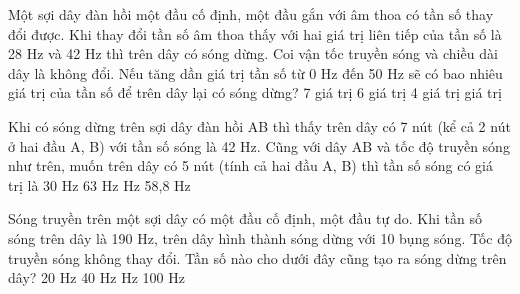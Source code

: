 \begin{ex}%
Một sợi dây đàn hồi một đầu cố định, một đầu gắn với âm thoa có tần số thay đổi được. Khi thay đổi tần số âm thoa thấy với hai giá trị liên tiếp của tần số là 28 Hz và 42 Hz thì trên dây có sóng dừng. Coi vận tốc truyền sóng và chiều dài dây là không đổi. Nếu tăng dần giá trị tần số từ 0 Hz đến 50 Hz sẽ có bao nhiêu giá trị của tần số để trên dây lại có sóng dừng?
\choice
{7 giá trị}
{6 giá trị}
{4 giá trị}
{ giá trị}
\end{ex} 
\begin{ex}%
Khi có sóng dừng trên sợi dây đàn hồi AB thì thấy trên dây có 7 nút (kể cả 2 nút ở hai đầu A, B) với tần số sóng là 42 Hz. Cũng với dây AB và tốc độ truyền sóng như trên, muốn trên dây có 5 nút (tính cả hai đầu A, B) thì tần số sóng có giá trị là
\choice
{30 Hz}
{63 Hz}
{ Hz}
{58,8 Hz}
\end{ex} 
\begin{ex}%
Sóng truyền trên một sợi dây có một đầu cố định, một đầu tự do. Khi tần số sóng trên dây là 190 Hz, trên dây hình thành sóng dừng với 10 bụng sóng. Tốc độ truyền sóng không thay đổi. Tần số nào cho dưới đây cũng tạo ra sóng dừng trên dây?
\choice
{20 Hz}
{40 Hz}
{ Hz}
{100 Hz}
\end{ex} 

